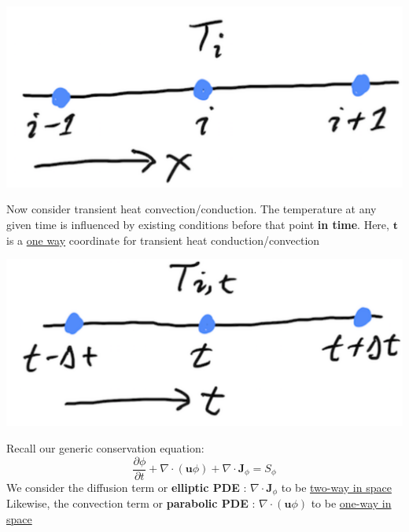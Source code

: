\documentclass[11pt]{article}
\begin{document}
\begin{center}
\includegraphics[scale=0.2]{pic/heatTwoway.png}
\end{center}
Now consider transient heat convection/conduction. The temperature at any given time is influenced by
existing conditions before that point \textbf{in time}. Here, \(\textbf{t}\) is a \uline{one way} coordinate for transient heat conduction/convection

\begin{center}
\includegraphics[scale=0.2]{pic/heatOneway.png}
\end{center}
Recall our generic conservation equation:
\begin{equation*}
\frac{\partial \phi}{\partial t} + \nabla \cdot (\textbf{u}\phi) + \nabla \cdot \textbf{J}_\phi = S_\phi
\end{equation*}
We consider the diffusion term or \textbf{elliptic PDE} :  \(\boxed{\nabla \cdot \textbf{J}_\phi}\) to be \uline{two-way in space}\\
Likewise, the convection term or \textbf{parabolic PDE} :  \(\boxed{\nabla \cdot (\textbf{u}\phi)}\) to be \uline{one-way in space} 
\end{document}
